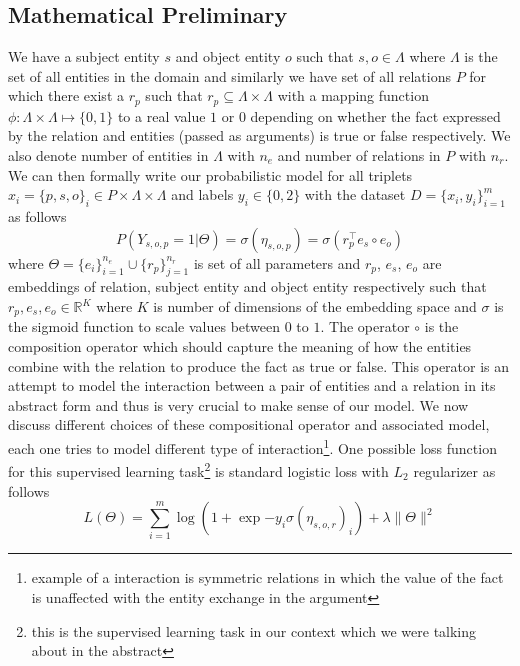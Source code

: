 \documentclass[12pt]{article}
\begin{document}
\subsection{Mathematical Preliminary}
We have a subject entity $s$ and object entity $o$ such that $s, o \in \Lambda$ where $\Lambda$ is the set of all entities in the domain and similarly we have set of all relations $P$ for which there exist a $r_{p}$ such that $r_{p} \subseteq \Lambda \times \Lambda $ with a mapping function $\phi: \Lambda \times \Lambda \mapsto \{0, 1\}$ to a real value $1$ or $0$ depending on whether the fact expressed by the relation and entities (passed as arguments) is true or false respectively. We also denote number of entities in $\Lambda$ with $n_{e}$ and number of relations in $P$ with $n_{r}$. We can then formally write our probabilistic model for all triplets $x_{i} = \{p, s, o\}_{i} \in P \times \Lambda \times \Lambda$ and labels $y_{i} \in \{0, 2\}$ with the dataset $D=\{x_{i}, y_{i}\}_{i=1}^{m}$ as follows
\begin{equation}
P(Y_{s, o, p}=1 | \Theta) = \sigma(\eta_{s, o, p}) = \sigma(r_{p}^{\intercal}e_{s}\circ e_{o})
\end{equation} where $\Theta=\{e_{i}\}_{i=1}^{n_{e}}\cup \{r_{p}\}_{j=1}^{n_{r}}$ is set of all parameters and $r_{p}$, $e_{s}$, $e_{o}$ are embeddings of relation, subject entity and object entity respectively such that $r_{p}, e_{s}, e_{o} \in \mathbb{R}^{K}$ where $K$ is number of dimensions of the embedding space and $\sigma$ is the sigmoid function to scale values between $0$ to $1$. The operator $\circ$ is the composition operator which should capture the meaning of how the entities combine with the relation to produce the fact as true or false. This operator is an attempt to model the interaction between a pair of entities and a relation in its abstract form and thus is very crucial to make sense of our model. We now discuss different choices of these compositional operator and associated model, each one tries to model different type of interaction\footnote{example of a interaction is symmetric relations in which the value of the fact is unaffected with the entity exchange in the argument}. One possible loss function for this supervised learning task\footnote{this is the supervised learning task in our context which we were talking about in the abstract} is standard logistic loss with $L_{2}$ regularizer as follows
\begin{equation}
L(\Theta) = \sum_{i=1}^{m}\log(1+\exp{-y_{i}\sigma(\eta_{s, o, r})_{i}}) + \lambda\|\Theta\|^{2}
\end{equation}
\end{document}
